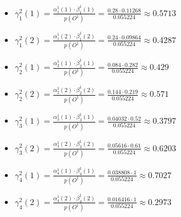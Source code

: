 \documentclass[11pt,a4paper]{article}
\begin{document}
	\begin{itemize}
		\item $\gamma_1^2(1) = \frac{\alpha_1^1(1) \cdot \beta_1^1(1)}{p(O^1)} =  \frac{0.28 \cdot 0.11268}{0.055224} \approx 0.5713$
		\item $\gamma_1^2(2) = \frac{\alpha_1^1(2) \cdot \beta_1^1(2)}{p(O^1)} =  \frac{0.24 \cdot 0.09864}{0.055224} \approx 0.4287$
		\item $\gamma_2^2(1) = \frac{\alpha_2^1(1) \cdot \beta_2^1(1)}{p(O^1)} =  \frac{0.084 \cdot 0.282}{0.055224} \approx 0.429$
		\item $\gamma_2^2(2) = \frac{\alpha_2^1(2) \cdot \beta_2^1(2)}{p(O^1)} =  \frac{0.144 \cdot 0.219}{0.055224} \approx 0.571$
		\item $\gamma_3^2(1) = \frac{\alpha_3^1(1) \cdot \beta_3^1(1)}{p(O^1)} =  \frac{0.04032 \cdot 0.52}{0.055224} \approx 0.3797$
		\item $\gamma_3^2(2) = \frac{\alpha_3^1(2) \cdot \beta_3^1(2)}{p(O^1)} =  \frac{0.05616 \cdot 0.61}{0.055224} \approx 0.6203$
		\item $\gamma_4^2(1) = \frac{\alpha_4^1(1) \cdot \beta_4^1(1)}{p(O^1)} =  \frac{0.038808 \cdot 1}{0.055224} \approx 0.7027$
		\item $\gamma_4^2(2) = \frac{\alpha_4^1(2) \cdot \beta_4^1(2)}{p(O^1)} =  \frac{0.016416 \cdot 1}{0.055224} \approx 0.2973$
	\end{itemize}
	
\end{document}
